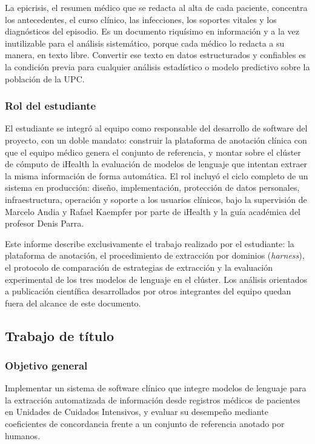 \documentclass[12pt,letterpaper]{article}
\begin{document}
La epicrisis, el resumen médico que se redacta al alta de cada paciente, concentra los antecedentes, el curso clínico, las infecciones, los soportes vitales y los diagnósticos del episodio. Es un documento riquísimo en información y a la vez inutilizable para el análisis sistemático, porque cada médico lo redacta a su manera, en texto libre. Convertir ese texto en datos estructurados y confiables es la condición previa para cualquier análisis estadístico o modelo predictivo sobre la población de la UPC.

\subsubsection{Rol del estudiante}

El estudiante se integró al equipo como responsable del desarrollo de software del proyecto, con un doble mandato: construir la plataforma de anotación clínica con que el equipo médico genera el conjunto de referencia, y montar sobre el clúster de cómputo de iHealth la evaluación de modelos de lenguaje que intentan extraer la misma información de forma automática. El rol incluyó el ciclo completo de un sistema en producción: diseño, implementación, protección de datos personales, infraestructura, operación y soporte a los usuarios clínicos, bajo la supervisión de Marcelo Andia y Rafael Kaempfer por parte de iHealth y la guía académica del profesor Denis Parra.

Este informe describe exclusivamente el trabajo realizado por el estudiante: la plataforma de anotación, el procedimiento de extracción por dominios (\textit{harness}), el protocolo de comparación de estrategias de extracción y la evaluación experimental de los tres modelos de lenguaje en el clúster. Los análisis orientados a publicación científica desarrollados por otros integrantes del equipo quedan fuera del alcance de este documento.

\subsection{Trabajo de título}

\subsubsection{Objetivo general}

Implementar un sistema de software clínico que integre modelos de lenguaje para la extracción automatizada de información desde registros médicos de pacientes en Unidades de Cuidados Intensivos, y evaluar su desempeño mediante coeficientes de concordancia frente a un conjunto de referencia anotado por humanos.
\end{document}
